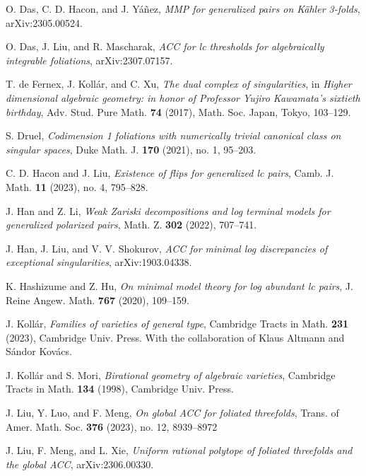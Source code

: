 \documentclass[11pt]{amsart}
\numberwithin{equation}{section}
\theoremstyle{definition}
\theoremstyle{definition}
\theoremstyle{definition}
\begin{document}
\begin{thebibliography}{99}
 O. Das, C. D. Hacon, and J. Y\'a\~nez, \textit{MMP for generalized pairs on K\"ahler 3-folds}, arXiv:2305.00524.

 O. Das, J. Liu, and R. Mascharak, \textit{ACC for lc thresholds for algebraically integrable foliations}, arXiv:2307.07157.

 T. de Fernex, J. Koll\'ar, and C. Xu, \textit{The dual complex of singularities}, in \textit{Higher dimensional algebraic geometry: in honor of Professor Yujiro Kawamata’s sixtieth birthday}, Adv. Stud. Pure Math. \textbf{74} (2017), Math. Soc. Japan, Tokyo, 103--129. 

 S. Druel, \textit{Codimension 1 foliations with numerically trivial canonical class on singular spaces}, Duke Math. J. \textbf{170} (2021), no. 1, 95--203.



 C. D. Hacon and J. Liu, \textit{Existence of flips for generalized lc pairs}, Camb. J. Math. \textbf{11} (2023), no. 4, 795--828.  


 J. Han and Z. Li, \textit{Weak Zariski decompositions and log terminal models for generalized polarized pairs}, Math. Z. \textbf{302} (2022), 707--741.

 J. Han, J. Liu, and V. V. Shokurov, \textit{ACC for minimal log discrepancies of exceptional singularities}, arXiv:1903.04338.


  K. Hashizume and Z. Hu, \textit{On minimal model theory for log abundant lc pairs}, J. Reine Angew. Math. \textbf{767} (2020), 109--159. 

 J. Koll\'ar, \textit{Families of varieties of general type}, Cambridge Tracts in Math. \textbf{231} (2023), Cambridge Univ. Press. With the collaboration of Klaus Altmann and S\'andor Kov\'acs.


 J. Koll\'{a}r and S. Mori, \textit{Birational geometry of algebraic varieties}, Cambridge Tracts in Math. \textbf{134} (1998), Cambridge Univ. Press.


 J. Liu, Y. Luo, and F. Meng, \textit{On global ACC for foliated threefolds},  Trans. of Amer. Math. Soc. \textbf{376} (2023), no. 12, 8939--8972


 J. Liu, F. Meng, and L. Xie, \textit{Uniform rational polytope of foliated threefolds and the global ACC}, arXiv:2306.00330.



\end{thebibliography}
\end{document}
